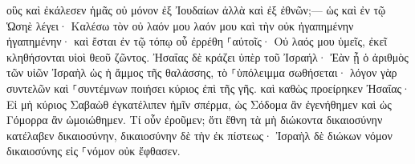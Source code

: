 \documentclass{openreader}
\begin{document}
οὓς καὶ ἐκάλεσεν ἡμᾶς οὐ μόνον ἐξ Ἰουδαίων ἀλλὰ καὶ ἐξ ἐθνῶν;— 
ὡς καὶ ἐν τῷ Ὡσηὲ λέγει· Καλέσω τὸν οὐ λαόν μου λαόν μου καὶ τὴν οὐκ ἠγαπημένην ἠγαπημένην· 
καὶ ἔσται ἐν τῷ τόπῳ οὗ ἐρρέθη ⸀αὐτοῖς· Οὐ λαός μου ὑμεῖς, ἐκεῖ κληθήσονται υἱοὶ θεοῦ ζῶντος. 
Ἠσαΐας δὲ κράζει ὑπὲρ τοῦ Ἰσραήλ· Ἐὰν ᾖ ὁ ἀριθμὸς τῶν υἱῶν Ἰσραὴλ ὡς ἡ ἄμμος τῆς θαλάσσης, τὸ ⸀ὑπόλειμμα σωθήσεται· 
λόγον γὰρ συντελῶν καὶ ⸀συντέμνων ποιήσει κύριος ἐπὶ τῆς γῆς. 
καὶ καθὼς προείρηκεν Ἠσαΐας· Εἰ μὴ κύριος Σαβαὼθ ἐγκατέλιπεν ἡμῖν σπέρμα, ὡς Σόδομα ἂν ἐγενήθημεν καὶ ὡς Γόμορρα ἂν ὡμοιώθημεν. 
Τί οὖν ἐροῦμεν; ὅτι ἔθνη τὰ μὴ διώκοντα δικαιοσύνην κατέλαβεν δικαιοσύνην, δικαιοσύνην δὲ τὴν ἐκ πίστεως· 
Ἰσραὴλ δὲ διώκων νόμον δικαιοσύνης εἰς ⸀νόμον οὐκ ἔφθασεν. 
\end{document}
